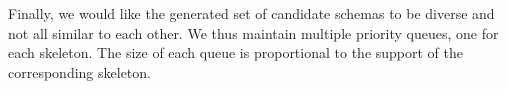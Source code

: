 %

Finally, we would like the generated set of candidate schemas
to be diverse and not all similar to each other.
We thus maintain multiple priority queues, one for each skeleton.
The size of each queue is proportional to the support of the corresponding
skeleton.
